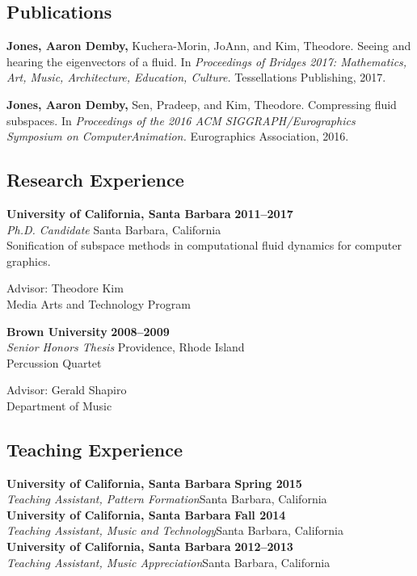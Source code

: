 {\subsection*{Publications}
{\bfseries Jones, Aaron Demby,} Kuchera-Morin, JoAnn, and Kim, Theodore. Seeing and hearing the eigenvectors of a fluid. In {\itshape Proceedings of Bridges 2017: Mathematics, Art, Music, Architecture, Education, Culture.} Tessellations Publishing, 2017.

{\bfseries Jones, Aaron Demby,} Sen, Pradeep, and Kim, Theodore. Compressing fluid subspaces. In {\itshape Proceedings of the 2016 ACM SIGGRAPH/Eurographics Symposium on ComputerAnimation.} Eurographics Association, 2016.

\subsection*{Research Experience}

{\bf University of California, Santa Barbara} \hfill {\bf 2011--2017}\\
{\em Ph.D. Candidate} \hfill Santa Barbara, California\\
Sonification of subspace methods in computational fluid dynamics for computer graphics.

Advisor: Theodore Kim\\
Media Arts and Technology Program

{\bf Brown University} \hfill {\bf 2008--2009}\\
{\em Senior Honors Thesis} \hfill Providence, Rhode Island\\
Percussion Quartet

Advisor: Gerald Shapiro\\
Department of Music

\subsection*{Teaching Experience}
{\bf University of California, Santa Barbara}  \hfill {\bf Spring 2015}\\
{\em Teaching Assistant, Pattern Formation}\hfill  Santa Barbara, California\\

{\bf University of California, Santa Barbara} \hfill {\bf Fall 2014}\\
{\em Teaching Assistant, Music and Technology}\hfill  Santa Barbara, California\\

{\bf University of California, Santa Barbara} \hfill {\bf 2012--2013}\\
{\em Teaching Assistant, Music Appreciation}\hfill  Santa Barbara, California\\

}
